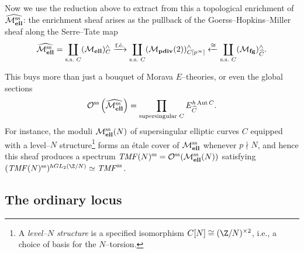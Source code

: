 Now we use the reduction above to extract from this a topological enrichment of $\widehat{\mathcal{M}_{\mathbf{ell}}^{\mathrm{ss}}}$: the enrichment sheaf arises as the pullback of the Goerss--Hopkins--Miller sheaf along the Serre--Tate map \[\widehat{\mathcal{M}_{\mathbf{ell}}^{\mathrm{ss}}} = \coprod_{\text{s.s.\ $C$}} (\mathcal{M}_{\mathbf{ell}})^\wedge_C \xrightarrow{\text{f.\'e.}} \coprod_{\text{s.s.\ $C$}} (\mathcal{M}_{\mathbf{pdiv}}(2))^\wedge_{C[p^\infty]} \xleftarrow{\cong} \coprod_{\text{s.s.\ $C$}} (\mathcal{M}_{\mathbf{fg}})^\wedge_{\widehat C}.\]

\begin{remark}
This buys more than just a bouquet of Morava $E$--theories, or even the global sections \[\mathcal{O}^{\mathrm{ss}}\left(\widehat{\mathcal{M}_{\mathbf{ell}}^{\mathrm{ss}}}\right) = \prod_{\text{supersingular $C$}} E_{\widehat C}^{h\operatorname{Aut} C}.\]  For instance, the moduli $\mathcal{M}_{\mathbf{ell}}^{\mathrm{ss}}(N)$ of supersingular elliptic curves $C$ equipped with a level--$N$ structure\footnote{A \textit{level--$N$ structure} is a specified isomorphism $C[N] \cong (\Z/N)^{\times 2}$, i.e., a choice of basis for the $N$--torsion.} forms an \'etale cover of $\mathcal{M}_{\mathbf{ell}}^{\mathrm{ss}}$ whenever $p \nmid N$, and hence this sheaf produces a spectrum $\mathit{TMF}(N)^{\mathrm{ss}} = \mathcal{O}^{\mathrm{ss}}(\mathcal{M}_{\mathbf{ell}}^{\mathrm{ss}}(N))$ satisfying $(\TMF(N)^{\ss})^{hGL_2(\Z/N)} \simeq \TMF^{\ss}$.
\end{remark}







\subsection*{The ordinary locus}

